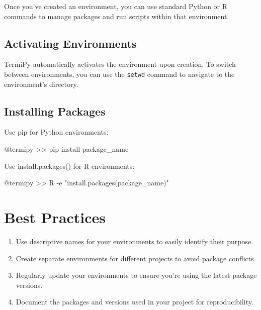 \documentclass[
  letterpaper,
  DIV=11,
  numbers=noendperiod]{scrreprt}
\newenvironment{Shaded}{\begin{snugshade}}{\end{snugshade}}
\newcommand{\AttributeTok}[1]{\textcolor[rgb]{0.40,0.45,0.13}{#1}}
\newcommand{\ExtensionTok}[1]{\textcolor[rgb]{0.00,0.23,0.31}{#1}}
\newcommand{\NormalTok}[1]{\textcolor[rgb]{0.00,0.23,0.31}{#1}}
\newcommand{\OperatorTok}[1]{\textcolor[rgb]{0.37,0.37,0.37}{#1}}
\newcommand{\StringTok}[1]{\textcolor[rgb]{0.13,0.47,0.30}{#1}}
\providecommand{\tightlist}{%
  \setlength{\itemsep}{0pt}\setlength{\parskip}{0pt}}\usepackage{longtable,booktabs,array}
\begin{document}

Once you've created an environment, you can use standard Python or R
commands to manage packages and run scripts within that environment.

\subsection*{Activating Environments}\label{activating-environments}

TermiPy automatically activates the environment upon creation. To switch
between environments, you can use the \texttt{setwd} command to navigate
to the environment's directory.

\subsection*{Installing Packages}\label{installing-packages}

Use pip for Python environments:

\begin{Shaded}
\begin{Highlighting}[]
\ExtensionTok{@termipy} \OperatorTok{\textgreater{}\textgreater{}}\NormalTok{ pip install package\_name}
\end{Highlighting}
\end{Shaded}

Use install.packages() for R environments:

\begin{Shaded}
\begin{Highlighting}[]
\ExtensionTok{@termipy} \OperatorTok{\textgreater{}\textgreater{}}\NormalTok{ R }\AttributeTok{{-}e} \StringTok{"install.packages(\textquotesingle{}package\_name\textquotesingle{})"}
\end{Highlighting}
\end{Shaded}

\section*{Best Practices}\label{best-practices}


\begin{enumerate}
\def\labelenumi{\arabic{enumi}.}
\tightlist
\item
  Use descriptive names for your environments to easily identify their
  purpose.
\item
  Create separate environments for different projects to avoid package
  conflicts.
\item
  Regularly update your environments to ensure you're using the latest
  package versions.
\item
  Document the packages and versions used in your project for
  reproducibility.
\end{enumerate}
\end{document}
